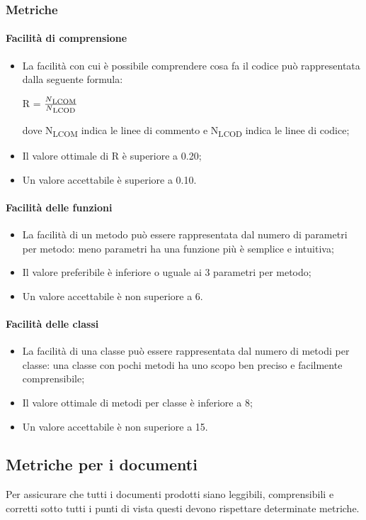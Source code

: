 		\subsubsection{Metriche}
			\paragraph{Facilità di comprensione}
			\begin{itemize}
			\item La facilità con cui è possibile comprendere cosa fa il codice può rappresentata dalla seguente formula: \\
			\centerline{R = \(\frac{N\textsubscript{LCOM}}{N\textsubscript{LCOD}} \) }
			dove N\textsubscript{LCOM} indica le linee di commento e N\textsubscript{LCOD} indica le linee di codice;
			\item Il valore ottimale di R è superiore a 0.20;
			\item Un  valore accettabile è superiore a 0.10.
			\end{itemize}
			\paragraph{Facilità delle funzioni}
			\begin{itemize}
			\item La facilità di un metodo può essere rappresentata dal numero di parametri per metodo: meno parametri ha una funzione più è semplice e intuitiva;
			\item Il valore preferibile è inferiore o uguale ai 3 parametri per metodo;
			\item Un valore accettabile  è non superiore a 6.
			\end{itemize}
			\paragraph{Facilità delle classi}
			\begin{itemize}
			\item La facilità di una classe può essere rappresentata dal numero di metodi per classe: una classe con pochi metodi ha uno scopo ben preciso e facilmente comprensibile;
			\item Il valore ottimale di metodi per classe è inferiore a 8;
			\item Un valore accettabile è non superiore a 15.
			\end{itemize}
	\subsection{Metriche per i documenti}
	Per assicurare che tutti i documenti prodotti siano leggibili, comprensibili e corretti sotto tutti i punti di vista questi devono rispettare determinate metriche.
